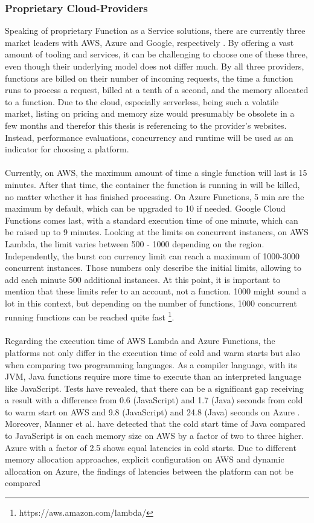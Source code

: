 \documentclass[a4paper,twoside,11pt, pagesize]{scrartcl}
\begin{document}
\subsubsection{Proprietary Cloud-Providers}
Speaking of proprietary Function as a Service solutions, there are currently three market leaders with AWS, Azure and Google, respectively \cite{kumar2019serverless}. By offering a vast amount of tooling and services, it can be challenging to choose one of these three, even though their underlying model does not differ much. By all three providers, functions are billed on their number of incoming requests, the time a function runs to process a request, billed at a tenth of a second, and the memory allocated to a function. Due to the cloud, especially serverless, being such a volatile market, listing on pricing and memory size would presumably be obsolete in a few months and therefor this thesis is referencing to the provider's websites. Instead, performance evaluations, concurrency and runtime will be used as an indicator for choosing a platform.\\\\ Currently, on AWS, the maximum amount of time a single function will last is 15 minutes. After that time, the container the function is running in will be killed, no matter whether it has finished processing. On Azure Functions, 5 min are the maximum by default, which can be upgraded to 10 if needed. Google Cloud Functions comes last, with a standard execution time of one minute, which can be raised up to 9 minutes. Looking at the limits on concurrent instances, on AWS Lambda, the limit varies between 500 - 1000 depending on the region. Independently, the burst con  currency limit can reach a maximum of 1000-3000 concurrent instances. Those numbers only describe the initial limits, allowing to add each minute 500 additional instances. At this point, it is important to mention that these limits refer to an account, not a function. 1000 might sound a lot in this context, but depending on the number of functions, 1000 concurrent running functions can be reached quite fast \footnote{https://aws.amazon.com/lambda/}.\\\\ Regarding the execution time of AWS Lambda and Azure Functions, the platforms not only differ in the execution time of cold and warm starts but also when comparing two programming languages. As a compiler language, with its JVM, Java functions require more time to execute than an interpreted language like JavaScript. Tests have revealed, that there can be a significant gap receiving a result with a difference from 0.6 (JavaScript) and 1.7 (Java) seconds from cold to warm start on AWS and 9.8 (JavaScript) and 24.8 (Java) seconds on Azure \cite{manner2018cold}. Moreover, Manner et al. have detected that the cold start time of Java compared to JavaScript is on each memory size on AWS by a factor of two to three higher. Azure with a factor of 2.5 shows equal latencies in cold starts. Due to different memory allocation approaches, explicit configuration on AWS and dynamic allocation on Azure, the findings of latencies between the platform can not be compared 
\end{document}
